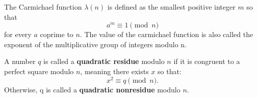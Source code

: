 \begin{definition}
\label{def:carmichael}
  The Carmichael function $\lambda(n)$ is defined as the smallest positive integer $m$ so that
  \[a^m \equiv 1 \pmod{n}\]
  for every $a$ coprime to $n$.
  The value of the carmichael function is also called the exponent of the multiplicative group of integers modulo n.
\end{definition}

\begin{definition}
  A number $q$ is called a \textbf{quadratic residue} modulo $n$ if it is congruent to a perfect square modulo $n$, meaning there exists $x$ so that:
  \[ x^2 \equiv q \pmod{n}. \]
  Otherwise, q is called a \textbf{quadratic nonresidue} modulo $n$.
\end{definition}

